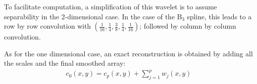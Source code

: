\documentclass[11pt,a4paper]{article}
\begin{document}
To facilitate computation, a simplification of this wavelet is to assume
separability in the 2-dimensional case.  In the case of the B$_3$ spline, this
leads to a row by row convolution with $(\frac{1}{16}, \frac{1}{4}, 
\frac{3}{8}, \frac{1}{4}, \frac{1}{16})$; followed by column by column 
convolution. 

As for the one dimensional case, an exact reconstruction is obtained
by adding all the scales and the final smoothed array:
\begin{eqnarray}
c_0(x,y) = c_{p}(x,y) + \sum_{j=1}^{p} w_j(x,y)
\label{eqn_rec}
\end{eqnarray}

% 
% 
 
\end{document}
